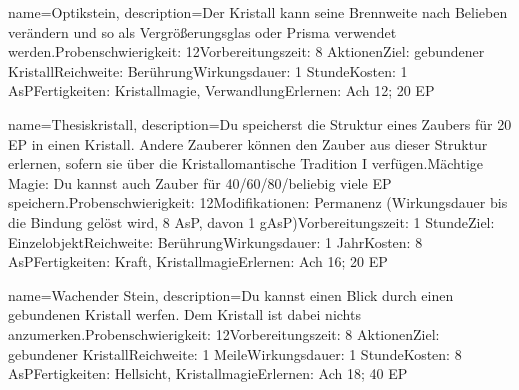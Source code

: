 {
    name={Optikstein},
    description={Der Kristall kann seine Brennweite nach Belieben verändern und so als Vergrößerungsglas oder Prisma verwendet werden.\newline Probenschwierigkeit: 12\newline Vorbereitungszeit: 8 Aktionen\newline Ziel: gebundener Kristall\newline Reichweite: Berührung\newline Wirkungsdauer: 1 Stunde\newline Kosten: 1 AsP\newline Fertigkeiten: Kristallmagie, Verwandlung\newline Erlernen: Ach 12; 20 EP}
}


{
    name={Thesiskristall},
    description={Du speicherst die Struktur eines Zaubers für 20 EP in einen Kristall. Andere Zauberer können den Zauber aus dieser Struktur erlernen, sofern sie über die Kristallomantische Tradition I verfügen.\newline Mächtige Magie: Du kannst auch Zauber für 40/60/80/beliebig viele EP speichern.\newline Probenschwierigkeit: 12\newline Modifikationen: Permanenz (Wirkungsdauer bis die Bindung gelöst wird, 8 AsP, davon 1 gAsP)\newline Vorbereitungszeit: 1 Stunde\newline Ziel: Einzelobjekt\newline Reichweite: Berührung\newline Wirkungsdauer: 1 Jahr\newline Kosten: 8 AsP\newline Fertigkeiten: Kraft, Kristallmagie\newline Erlernen: Ach 16; 20 EP}
}


{
    name={Wachender Stein},
    description={Du kannst einen Blick durch einen gebundenen Kristall werfen. Dem Kristall ist dabei nichts anzumerken.\newline Probenschwierigkeit: 12\newline Vorbereitungszeit: 8 Aktionen\newline Ziel: gebundener Kristall\newline Reichweite: 1 Meile\newline Wirkungsdauer: 1 Stunde\newline Kosten: 8 AsP\newline Fertigkeiten: Hellsicht, Kristallmagie\newline Erlernen: Ach 18; 40 EP}
}


